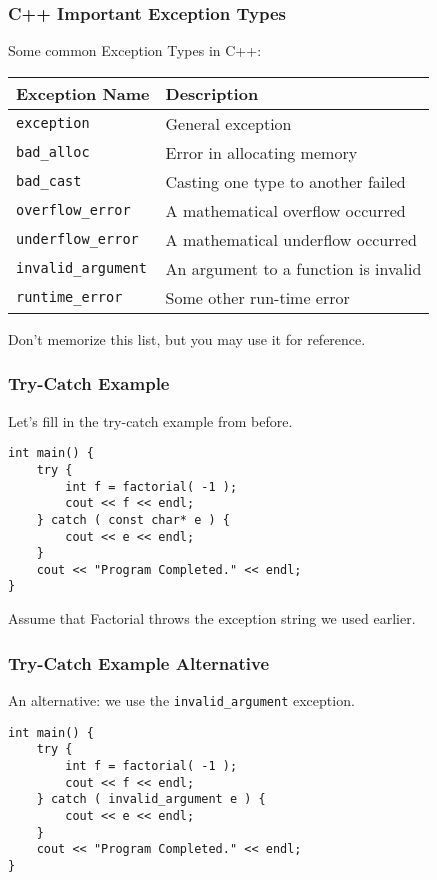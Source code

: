 \begin{frame}
\frametitle{C++ Important Exception Types}

Some common Exception Types in C++:

{\scriptsize
\begin{center}
\begin{tabular}{l|l}
\textbf{Exception Name} & \textbf{Description} \\ \hline
\texttt{exception} & General exception \\ \hline
\texttt{bad\_alloc} & Error in allocating memory \\ \hline
\texttt{bad\_cast} & Casting one type to another failed \\ \hline
\texttt{overflow\_error} & A mathematical overflow occurred \\ \hline
\texttt{underflow\_error} & A mathematical underflow occurred \\ \hline
\texttt{invalid\_argument} & An argument to a function is invalid \\ \hline
\texttt{runtime\_error} & Some other run-time error \\
\end{tabular}
\end{center}
}

Don't memorize this list, but you may use it for reference.

\end{frame}


\begin{frame}[fragile]
\frametitle{Try-Catch Example}

Let's fill in the try-catch example from before.

\begin{verbatim}
int main() {
    try {
        int f = factorial( -1 );
        cout << f << endl;
    } catch ( const char* e ) {
        cout << e << endl;
    }
    cout << "Program Completed." << endl;
}
\end{verbatim}

Assume that Factorial throws the exception string we used earlier.

\end{frame}

\begin{frame}[fragile]
\frametitle{Try-Catch Example Alternative}

An alternative: we use the \texttt{invalid\_argument} exception.

\begin{verbatim}
int main() {
    try {
        int f = factorial( -1 );
        cout << f << endl;
    } catch ( invalid_argument e ) {
        cout << e << endl;
    }
    cout << "Program Completed." << endl;
}
\end{verbatim}


\end{frame}

